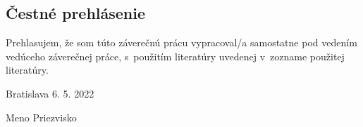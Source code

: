 \null
\vfill
\thispagestyle{empty}

\subsection*{Čestné prehlásenie}

Prehlasujem, že som túto záverečnú prácu vypracoval/a samostatne pod vedením vedúceho záverečnej práce, s~použitím literatúry uvedenej v~zozname použitej literatúry.

\vspace{10pt}

\noindent Bratislava 6. 5. 2022 \hfil
\newline

\begin{flushright}
	Meno Priezvisko$\qquad$
\end{flushright}
\newpage

\